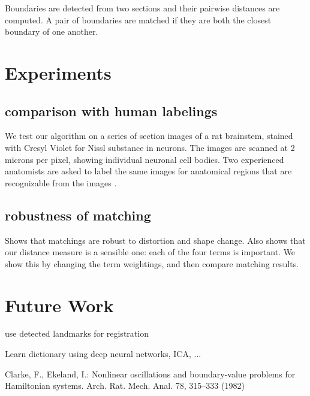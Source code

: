\documentclass{llncs}
\begin{document}
Boundaries are detected from two sections and their pairwise distances are computed. A pair of boundaries are matched if they are both the closest boundary of one another.

\section{Experiments}

\subsection{comparison with human labelings}

We test our algorithm on a series of section images of a rat brainstem, stained with Cresyl Violet for Nissl substance in neurons. The images are scanned at 2 microns per pixel, showing individual neuronal cell bodies. Two experienced anatomists are asked to label the same images for anatomical regions that are recognizable from the images .

\subsection{robustness of matching}

Shows that matchings are robust to distortion and shape change.
Also shows that our distance measure is a sensible one: each of the four terms is important. We show this by changing the term weightings, and then compare matching results.

\section{Future Work}

use detected landmarks for registration

Learn dictionary using deep neural networks, ICA, ...



%
%
\begin{thebibliography}{5}
%
Clarke, F., Ekeland, I.:
Nonlinear oscillations and
boundary-value problems for Hamiltonian systems.
Arch. Rat. Mech. Anal. 78, 315--333 (1982)

\end{thebibliography}
\end{document}
